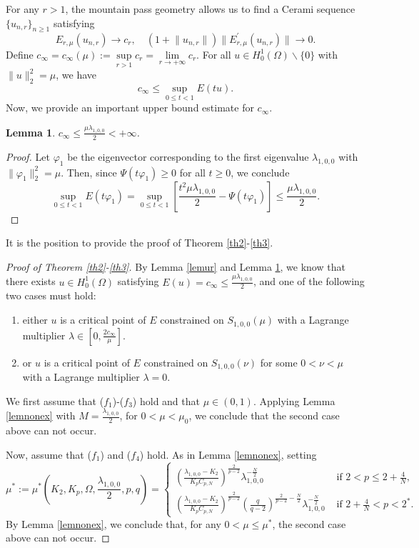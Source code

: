 \documentclass[11pt]{amsart}
\newtheorem{lemma}[theorem]{Lemma}
\newcommand{\norm}[1]{\lVert#1\rVert}
\numberwithin{equation}{section}
\begin{document}
For any $r>1$, the mountain pass geometry allows us to find a Cerami sequence $\{u_{n,r}\}_{n\geq 1}$  satisfying
\begin{equation*}
 E_{r, \mu}(u_{n,r}) \rightarrow c_{r}, \quad (1+\norm{u_{n,r}})\norm{E_{r, \mu}^{\prime}(u_{n,r})} \rightarrow 0.
\end{equation*}
Define $c_\infty=c_{\infty}(\mu):=\sup\limits_{r>1} c_{r}=\lim\limits_{r\to + \infty} c_{r}$. For all $u \in H^1_0(\Omega) \backslash\{0\}$ with $\norm{u}_2^2 = \mu$, we have
\begin{equation}\label{eqcssup}
 c_{\infty} \leq \sup _{0 \leq t<1} E(t u).
\end{equation}
Now, we provide an important upper bound estimate for $c_\infty$.
\begin{lemma}\label{lemcin}
 $c_{\infty}  \leq \frac{\mu\lambda_{1,0,0}}{2} < +\infty$.
\end{lemma}
\begin{proof}
Let $\varphi_1$ be the eigenvector corresponding to the first eigenvalue $\lambda_{1,0,0}$ with $\norm{\varphi_1}^2_2=\mu$. Then, since $\Psi(t\varphi_1) \geq 0$ for all $t \geq  0$, we conclude
$$
\sup _{0 \leq t<1}E(t\varphi_1) = \sup _{0 \leq t<1}\left[\frac{t^2\mu\lambda_{1,0,0}}{2} - \Psi(t\varphi_1)\right]\leq \frac{\mu\lambda_{1,0,0}}{2}.
$$
\end{proof}
It is the position to provide the proof of Theorem \ref{th2}-\ref{th3}.
\begin{proof}[Proof of Theorem \ref{th2}-\ref{th3}]
By Lemma \ref{lemur} and Lemma \ref{lemcin}, we know that there exists $u \in H^1_0(\Omega)$ satisfying $E(u)=c_\infty\leq \frac{\mu\lambda_{1,0,0}}{2}$, and one of the following two cases must hold:
     \begin{enumerate}[label=\rm(\roman*)]
\item either $u$ is a critical point of $E$ constrained on $S_{1,0,0}(\mu)$ with a Lagrange multiplier $\lambda \in [0,\frac{2c_\infty}{\mu}]$.
\item  or $u$ is a critical point of $E$ constrained on $S_{1,0,0}(\nu)$ for some $0<\nu < \mu$ with a Lagrange multiplier $\lambda =0$.
    \end{enumerate}
We first assume that ($f_1$)-($f_3$) hold and that $\mu \in (0,1)$. Applying Lemma \ref{lemnonex} with $M=\frac{\lambda_{1,0,0}}{2}$, for $0<\mu <\mu_0$, we conclude that the second case above can not occur.

Now, assume that ($f_1$) and ($f_4$) hold. As in Lemma \ref{lemnonex}, setting
$$
\mu^*:=\mu^*(K_2,K_p,\Omega,\frac{\lambda_{1,0,0}}{2},p,q)=
\begin{cases}
 \left(\frac{\lambda_{1,0,0}-K_2}{K_pC_{p,N}}\right)^{\frac{2}{p-2}}\lambda_{1,0,0}^{-\frac{N}{2}}  &\text{ if } 2<p\leq 2+\frac{4}{N},\\
    \left(\frac{\lambda_{1,0,0}-K_2}{K_pC_{p,N}}\right)^{\frac{2}{p-2}}\left(\frac{q}{q-2}\right)^{{\frac{2}{p-2}}-\frac{N}{2}}\lambda_{1,0,0}^{-\frac{N}{2}} &\text{ if }  2+\frac{4}{N}<p<2^*.
\end{cases}
$$
By Lemma \ref{lemnonex}, we conclude that, for any $0<\mu\leq\mu^*$,
the second case above can not occur.
\end{proof}
\end{document}
